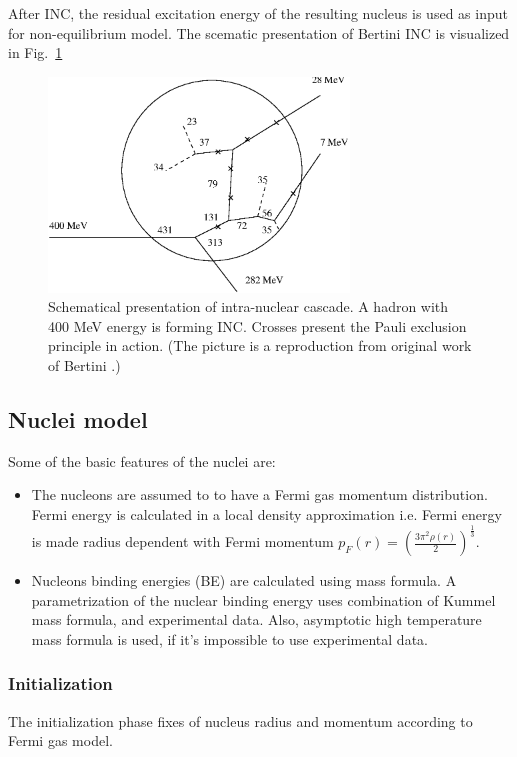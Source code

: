 \documentclass[twocolumn,twoside,slac]{revtex4}
\begin{document}
After INC, the residual excitation energy of the resulting nucleus is used as input for non-equilibrium model. The scematic presentation of Bertini INC is visualized in Fig.~\ref{figMC}


\begin{figure}
  \includegraphics[width=80mm,keepaspectratio]{mc.eps}
  \caption{Schematical presentation of intra-nuclear cascade. A hadron with 400 MeV energy is forming INC. Crosses present the Pauli exclusion principle in action. (The picture is a reproduction from original work of Bertini \cite{bertini68}.)}
  \label{figMC}
\end{figure}



\subsection{Nuclei model}

Some of the basic features of the nuclei are:

\begin{itemize}
\item The nucleons are assumed to to have a Fermi gas momentum distribution. 
Fermi energy is calculated in a local density approximation i.e. 
Fermi energy is made radius dependent with Fermi momentum $p_{F}(r) = (\frac{3 \pi^2 \rho(r)}{2})^\frac{1}{3}$.
\item Nucleons binding energies (BE) are calculated using mass formula.
A parametrization of the nuclear binding energy uses combination of Kummel mass formula, and
experimental data. Also, asymptotic high temperature mass formula is used, 
if it's impossible to use experimental data.
\end{itemize}

\subsubsection{Initialization}
The initialization phase fixes of nucleus radius  and momentum according to Fermi gas model.
\end{document}
